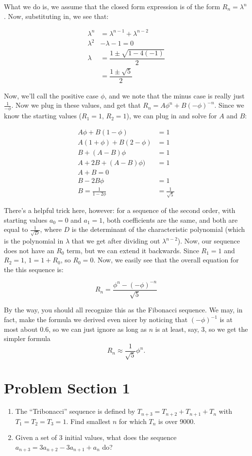 \documentclass[12pt,letterpaper]{article}
\begin{document}
What we do is, we assume that the closed form expression is of the
form $R_n = \lambda^n$. Now, substituting in, we see that:

\begin{align*}
\lambda^n & = \lambda^{n-1} + \lambda^{n-2} \\
\lambda^2 & - \lambda - 1 = 0 \\
\lambda & = \dfrac{1 \pm \sqrt{1 - 4 (-1)}}{2} \\
        & = \dfrac{1 \pm \sqrt{5}}{2}
\end{align*}

Now, we'll call the positive case $\phi$, and we note that the minus
case is really just $\frac1{-\phi}$. Now we plug in these values, and get
that $R_n = A \phi^n + B (-\phi)^{-n}$. Since we know the starting
values ($R_1 = 1$, $R_2 = 1$), we can plug in and solve for $A$ and
$B$:

\begin{align*}
  A \phi + B (1 - \phi) & = 1 \\
  A (1 + \phi) + B (2 - \phi) & = 1 \\
  B + (A - B) \phi & = 1 \\
  A + 2B + (A - B)\phi) & = 1 \\
  A + B = 0 \\
  B - 2B \phi & = 1 \\
  B = \frac{1}{1-2\phi} & = \frac1{\sqrt{5}}
\end{align*}

There's a helpful trick here, however: for a sequence of the second
order, with starting values $a_0 = 0$ and $a_1 = 1$, both coefficients
are the same, and both are equal to $\frac1{\sqrt{D}}$, where $D$ is the
determinant of the characteristic polynomial (which is the polynomial
in $\lambda$ that we get after dividing out $\lambda^{n-2}$). Now, our
sequence does not have an $R_0$ term, but we can extend it
backwards. Since $R_1 = 1$ and $R_2 = 1$, $1 = 1 + R_0$, so $R_0 = 0$.
Now, we easily see that the overall equation for the this sequence is:

$$R_n = \frac{\phi^n - (-\phi)^{-n}}{\sqrt{5}}$$

By the way, you should all recognize this as the Fibonacci sequence. We
may, in fact, make the formula we derived even nicer by noticing that
$(-\phi)^{-1}$ is at most about $0.6$, so we can just ignore as long
as $n$ is at least, say, 3, so we get the simpler formula $$R_n \approx
\frac1{\sqrt{5}} \phi^n.$$

\section{Problem Section 1}
\begin{enumerate}
  \item The ``Tribonacci'' sequence is defined by $T_{n+3} = T_{n+2} + T_{n+1}
  + T_n$ with $T_1 = T_2 = T_3 = 1$. Find smallest $n$ for which $T_n$ is over
  9000.
  \item Given a set of 3 initial values, what does the sequence $a_{n+3} =
  3a_{n+2} - 3a_{n+1} + a_n$ do?
\end{enumerate}
\end{document}
